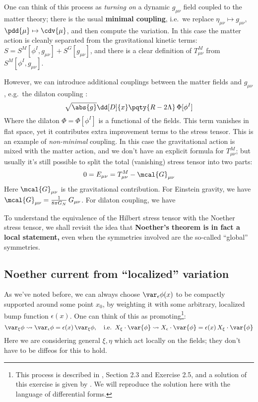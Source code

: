 \documentclass[a4paper
	,10pt
]{article}
\begin{document}
	
	One can think of this process as \textit{turning on} a dynamic $g_{\mu\nu}$ field coupled to the matter theory; there is the usual \textbf{minimal coupling}, i.e.~we replace $\eta_{\mu\nu} \mapsto g_{\mu\nu}$, $\pdd{\mu} \mapsto \cdv{\mu}$, and then compute the variation. In this case the matter action is cleanly separated from the gravitational kinetic terms: $S = S^M[\phi^I,g_{\mu\nu}] + S^G[g_{\mu\nu}]$, and there is a clear definition of $T^M_{\mu\nu}$ from $S^M[\phi^I,g_{\mu\nu}]$.
	
	However, we can introduce additional couplings between the matter fields and $g_{\mu\nu}$, e.g.~the dilaton coupling \cite{Polchinski:1998rq}:
	\begin{equation}
			\sqrt{\abs{g}} \dd[D]{x}
			\pqty{R - 2\Lambda}\,\Phi[\phi^I]
	\end{equation}
	Where the dilaton $\Phi = \Phi[\phi^I]$ is a functional of the fields. This term vanishes in flat space, yet it contributes extra improvement terms to the stress tensor. This is an example of \textit{non-minimal} coupling. In this case the gravitational action is mixed with the matter action, and we don't have an explicit formula for $T^M_{\mu\nu}$; but usually it's still possible to split the total (vanishing) stress tensor into two parts:
	\begin{equation}
		0 = E_{\mu\nu}
		= T^M_{\mu\nu}
			- \mcal{G}_{\mu\nu}
	\end{equation}
	Here $\mcal{G}_{\mu\nu}$ is the gravitational contribution. For Einstein gravity, we have $
		\mcal{G}_{\mu\nu}
		= \frac{1}{8\pi G_N}\,G_{\mu\nu}
	$. For dilaton coupling, we have
	
	
	\newparagraph
	To understand the equivalence of the Hilbert stress tensor with the Noether stress tensor, we shall revisit the idea that \textbf{Noether's theorem is in fact a local statement,} even when the symmetries involved are the so-called ``global'' symmetries. 
\subsection{Noether current from ``localized'' variation}
	As we've noted before, we can always choose $\var_\epsilon \phi(x)$ to be compactly supported around some point $x_0$, by weighting it with some arbitrary, localized bump function $\epsilon(x)$. One can think of this as promoting\footnote{
		This process is described in \textcite{Polchinski:1998rq}, Section 2.3 and Exercise 2.5, and a solution of this exercise is given by \cite{Headrick:2008ke}. We will reproduce the solution here with the language of differential forms.
	}:
	\begin{equation}
		\var_\xi \phi
		\leadsto \var_\epsilon \phi
		= \epsilon(x)\,\var_\xi \phi,
	\quad\text{i.e.}\ \,
		X_\xi \cdot \var{\phi}
		\leadsto X_\epsilon \cdot \var{\phi}
		= \epsilon(x)\,X_\xi \cdot \var{\phi}
	\end{equation}
	Here we are considering general $\xi,\eta$ which act locally on the fields; they don't have to be diffeos for this to hold. 
	
\end{document}
